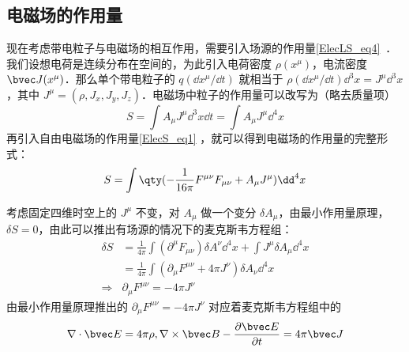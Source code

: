 \subsection{电磁场的作用量}
现在考虑带电粒子与电磁场的相互作用，需要引入场源的作用量\autoref{ElecLS_eq4}~．我们设想电荷是连续分布在空间的，为此引入电荷密度 $\rho(x^\mu)$，电流密度 $\bvec J(x^\mu)$．那么单个带电粒子的 $q(\dd x^\mu/\dd t)$ 就相当于 $\rho (\dd x^\mu / \dd t) {\dd} ^3 x=J^\mu {\dd}^3 x$，其中 $J^\mu=(\rho,J_x,J_y,J_z)$．电磁场中粒子的作用量可以改写为（略去质量项）
\begin{equation}
S=\int A_\mu J^\mu {\dd}^3 x\dd t=\int A_\mu J^\mu {\dd}^4 x
\end{equation}
再引入自由电磁场的作用量\autoref{ElecS_eq1} ，就可以得到电磁场的作用量的完整形式：
\begin{equation}
S=\int \qty(-\frac{1}{16\pi}F^{\mu\nu}F_{\mu\nu}+A_\mu J^\mu ){\dd}^4 x
\end{equation}

考虑固定四维时空上的 $J^\mu$ 不变，对 $A_\mu$ 做一个变分 $\delta A_\mu$，由最小作用量原理，$\delta S=0$，由此可以推出有场源的情况下的麦克斯韦方程组：
\begin{equation}
\begin{aligned}
\delta S&=\frac{1}{4\pi}\int (\partial^\mu F_{\mu\nu})\delta A^\nu {\dd}^4 x +\int J^\mu \delta A_\mu {\dd}^4 x\\
&=\frac{1}{4\pi}\int (\partial_\mu F^{\mu\nu}+4\pi J^\nu)\delta A_\nu {\dd}^4 x\\
\Rightarrow &\partial_\mu F^{\mu\nu}=-4\pi J^\nu
\end{aligned}
\end{equation}
由最小作用量原理推出的 $\partial_\mu F^{\mu\nu}=-4\pi J^\nu$ 对应着麦克斯韦方程组中的
\begin{equation}
\nabla \cdot \bvec E=4\pi \rho,\nabla\times \bvec B-\frac{\partial \bvec E}{\partial t}=4\pi \bvec J
\end{equation}